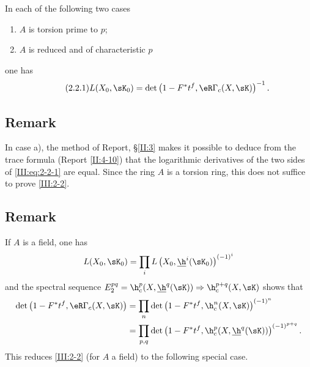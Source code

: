 \begin{theorem_}\label{III:2-2}
In each of the following two cases
\begin{enumerate}[\indent a)]
  \item $A$ is torsion prime to $p$;
  \item $A$ is reduced and of characteristic $p$
\end{enumerate}
one has
\begin{equation*}\tag{2.2.1}\label{III:eq:2-2-1}
  L(X_0,\sK_0) = \det\left(1-F^* t^f, \eR\Gamma_c(X,\sK)\right)^{-1} \text{.}
\end{equation*}
\end{theorem_}






\subsection{Remark}\label{III:2-3}

In case a), the method of Report, \S\ref{II:3} makes it possible to deduce
from the trace formula (Report \ref{II:4-10}) that the logarithmic derivatives
of the two sides of \eqref{III:eq:2-2-1} are equal. Since the ring $A$ is a
torsion ring, this does not suffice to prove \ref{III:2-2}.






\subsection{Remark}\label{III:2-4}

If $A$ is a field, one has
\[
  L(X_0,\sK_0) = \prod_i L\left(X_0,\underline\h^i(\sK_0)\right)^{(-1)^i}
\]
and the spectral sequence
$E_2^{p q} = \h_c^p(X,\underline\h^q(\sK))\Rightarrow \h_c^{p+q}(X,\sK)$ shows
that
\begin{align*}
  \det\left(1-F^* t^f, \eR\Gamma_c(X,\sK)\right)
    &= \prod_n \det\left(1-F^* t^f,\h_c^n(X,\sK)\right)^{(-1)^n} \\
    &= \prod_{p,q} \det\left(1-F^* t^f,\h_c^p(X,\underline\h^q(\sK))\right)^{(-1)^{p+q}} \text{.}
\end{align*}
This reduces \ref{III:2-2} (for $A$ a field) to the following special case.


\subsubsection{}\label{III:2-4-1}

